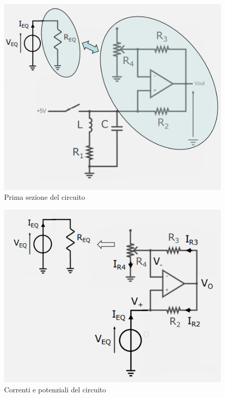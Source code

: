\documentclass{article}
\begin{document}
\begin{figure}[h]
  \centering
  \includegraphics[scale=0.7]{IM_circuito_risonante_parallelo_attivo_1}
  \caption{Prima sezione del circuito}
  \label{Schema_circuito_risonante_parallelo_attivo_1}
\end{figure}
\clearpage
\begin{figure}[h]
  \centering
  \includegraphics[scale=0.7]{IM_circuito_risonante_parallelo_attivo_2}
  \caption{Correnti e potenziali del circuito}
  \label{Schema_circuito_risonante_parallelo_attivo_2}
\end{figure}
\end{document}
